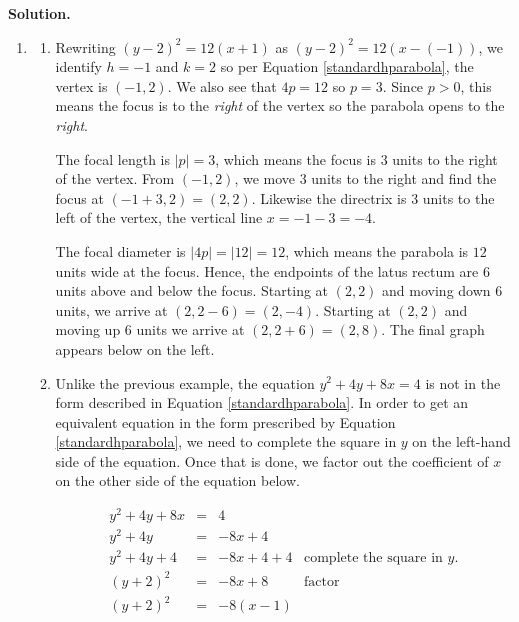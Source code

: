 \documentclass{ximera}
\begin{document}
\begin{example}
\begin{enumerate}
\begin{enumerate}
\begin{center}
\end{center}

\end{enumerate}


\end{enumerate}

\medskip

{\bf Solution.} 


\begin{enumerate}

\item

\begin{enumerate}

\item  Rewriting $(y-2)^2 = 12(x+1)$ as $(y-2)^2 = 12(x-(-1))$, we identify $h=-1$ and $k=2$ so per  Equation \ref{standardhparabola}, the vertex is $(-1,2)$.  We also see that $4p = 12$ so $p = 3$.  Since $p>0$, this means the focus is to the \textit{right} of the vertex so the parabola opens to the \textit{right}.


\smallskip

The focal length is $|p| = 3$, which means the focus is $3$ units to the right of the vertex.  From $(-1,2)$, we move  $3$ units to the right and find the focus at $(-1+3,2) = (2,2)$.  Likewise the directrix is $3$ units to the left of the vertex, the vertical  line $x=-1-3 = -4$.  


\smallskip

The focal diameter is $|4p| = |12| = 12$, which means the parabola is $12$ units wide at the focus.  Hence, the endpoints of the latus rectum are $6$ units above and below  the focus.  Starting at $(2,2)$ and moving down $6$ units, we arrive at $(2,2-6) = (2,-4)$.  Starting at $(2,2)$ and moving up  $6$ units we arrive at $(2,2+6) = (2,8)$.  The final graph appears below on the left.

\item  Unlike the previous example, the equation  $y^2 + 4y + 8x = 4$ is not in the form described  in Equation \ref{standardhparabola}.  In order to get an equivalent equation in the form prescribed by  Equation \ref{standardhparabola}, we need to complete the square in $y$  on the left-hand side of the equation.  Once that is done, we  factor out the coefficient of $x$ on the other side of the equation below.

\[ \begin{array}{rclr} y^2+4y+8x &  = & 4 & \\
y^2 + 4y &  = & -8x + 4 &  \\
y^2+4y+4 & = & -8x+4+4 & \mbox{complete the square in $y$.} \\
(y+2)^2 & = &-8x+8 & \mbox{factor}  \\ 
(y+2)^2 & = & -8(x-1) &   \end{array} \]


\end{enumerate}
\end{enumerate}
\end{example}
\end{document}

